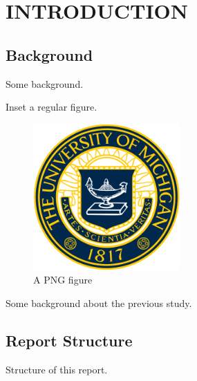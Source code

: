 \chapter{INTRODUCTION}

\section{Background}
Some background\cite{kopka1995guide}.

Inset a regular figure.

\begin{figure}[!htbp]
    \centering
    \includegraphics[width=0.5\textwidth]{fig/um_seal.png}
    \caption{A PNG figure}
    \label{fig:png_figure}
\end{figure}


Some background about the previous study\cite{collinslatexmk}.

\section{Report Structure}
Structure of this report.